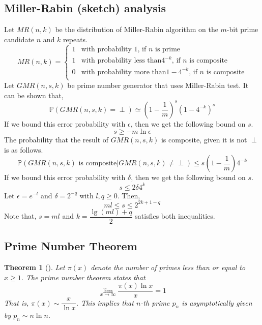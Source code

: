 \documentclass{article}
\newtheorem{theorem}{Theorem}
\begin{document}
\subsection{Miller-Rabin (sketch) analysis}
Let \(MR(n,k)\) be the distribution of Miller-Rabin algorithm on the \(m\)-bit prime candidate \(n\) and \(k\) repeats.
\begin{equation*}
	MR(n,k) = \begin{cases}
		1 & \text{with probability 1, if } n \text{ is prime}\\
		1 & \text{with probability less than} 4^{-k} \text{, if } n \text{ is composite}\\
		0 & \text{with probability more than} 1- 4^{-k} \text{, if } n \text{ is composite}\\
	\end{cases}
\end{equation*}
Let \(GMR(n,s,k)\) be prime number generator that uses Miller-Rabin test. It can be shown that,
\begin{equation*}
	\mathbb{P}(GMR(n,s,k) = \perp) \simeq ( 1 - \frac{1}{m})^s (1 - 4^{-k})^s
\end{equation*}
If we bound this error probability with \(\epsilon\), then we get the following bound on \(s\).
\begin{equation*}
	s \geq -m \ln \epsilon
\end{equation*}
The probability that the result of \(GMR(n,s,k)\) is composite, given it is not \(\perp\) is as follows.
\begin{equation*}
	\mathbb{P}(GMR(n,s,k) \text{ is composite}| GMR(n,s,k) \neq \perp ) \leq s (1 - \frac{1}{m}) 4^{-k}
\end{equation*}
If we bound this error probability with \(\delta\), then we get the following bound on \(s\).
\begin{equation*}
	s \leq 2 \delta 4^k
\end{equation*}
Let \(\epsilon = e^{-l}\) and \(\delta = 2^{-q}\) with \(l,q \geq 0\). Then, 
\begin{equation*}
	ml \leq s \leq 2^{2k + 1 - q}
\end{equation*}
Note that, \(s = ml\) and \(k = \dfrac{\lg(ml) + q}{2}\) satisfies both inequalities.

\subsection{Prime Number Theorem}
\begin{theorem}[\cite{apostol}]
	Let \(\pi(x)\) denote the number of primes less than or equal to \(x \geq 1\). The prime number theorem states that 
	\begin{equation*}
		\lim_{x \to \infty} \dfrac{\pi(x) \ln x}{x} = 1
	\end{equation*}
	That is, \(\pi(x) \sim \dfrac{x}{\ln x}\). This implies that \(n\)-th prime \(p_n\) is asymptotically given by \(p_n \sim n \ln n\).
\end{theorem}
\end{document}
